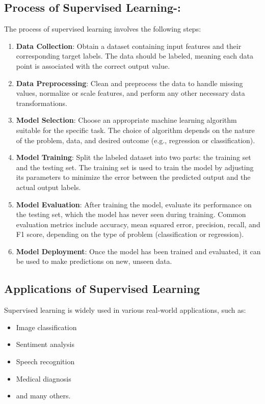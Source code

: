 \documentclass{article}
\begin{document}
\subsection{Process of Supervised Learning-:}
The process of supervised learning involves the following steps:

\begin{enumerate}[label=\arabic*.]
    \item \textbf{Data Collection}: Obtain a dataset containing input features and their corresponding target labels. The data should be labeled, meaning each data point is associated with the correct output value.
    
    \item \textbf{Data Preprocessing}: Clean and preprocess the data to handle missing values, normalize or scale features, and perform any other necessary data transformations.
    
    \item \textbf{Model Selection}: Choose an appropriate machine learning algorithm suitable for the specific task. The choice of algorithm depends on the nature of the problem, data, and desired outcome (e.g., regression or classification).
    
    \item \textbf{Model Training}: Split the labeled dataset into two parts: the training set and the testing set. The training set is used to train the model by adjusting its parameters to minimize the error between the predicted output and the actual output labels.
    
    \item \textbf{Model Evaluation}: After training the model, evaluate its performance on the testing set, which the model has never seen during training. Common evaluation metrics include accuracy, mean squared error, precision, recall, and F1 score, depending on the type of problem (classification or regression).
    
    \item \textbf{Model Deployment}: Once the model has been trained and evaluated, it can be used to make predictions on new, unseen data.
\end{enumerate}

\subsection{Applications of Supervised Learning}
Supervised learning is widely used in various real-world applications, such as:
\begin{itemize}
    \item Image classification
    \item Sentiment analysis
    \item Speech recognition
    \item Medical diagnosis
    \item and many others.
\end{itemize}
\end{document}
